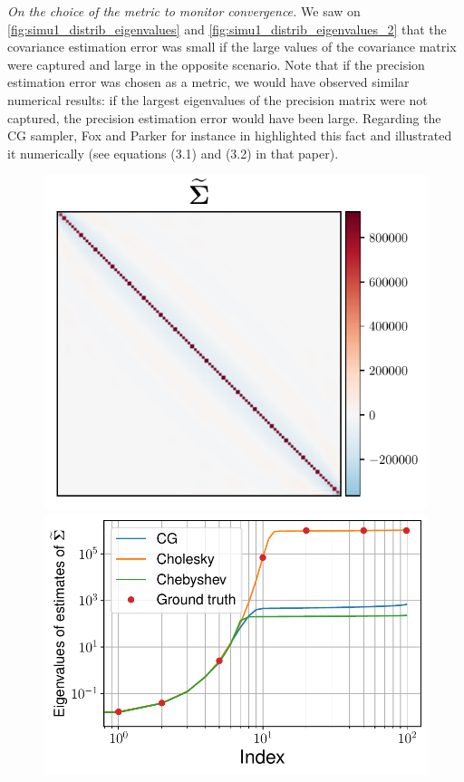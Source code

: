\documentclass[nohypdvips,onefignum,onetabnum]{siamart171218}
\begin{document}
\emph{On the choice of the metric to monitor convergence.} We saw on \cref{fig:simu1_distrib_eigenvalues} and \cref{fig:simu1_distrib_eigenvalues_2} that the covariance estimation error was small if the large values of the covariance matrix were captured and large in the opposite scenario.
Note that if the precision estimation error was chosen as a metric, we would have observed similar numerical results: if the largest eigenvalues of the precision matrix were not captured, the precision estimation error would have been large.
Regarding the CG sampler, Fox and Parker for instance in \cite{FoxParker14} highlighted this fact and illustrated it numerically (see equations (3.1) and (3.2) in that paper).

%
\begin{figure}
  \centering
  \mbox{{\includegraphics[scale=0.45]{images/simu1_ex1_invA.pdf}}}
  \mbox{{\includegraphics[scale=0.4]{images/simu1_ex1_eigvals_invA.pdf}}}

\end{figure}
\end{document}
